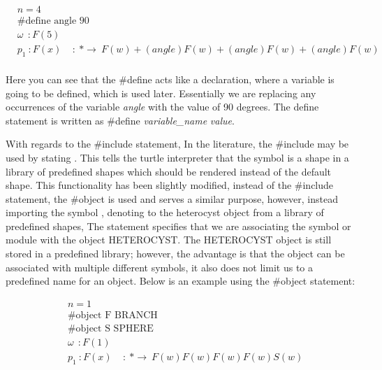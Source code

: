 \begin{singlespace}
\begin{equation} \label{define statement example}
\begin{aligned}
	&n=4 \\
	&\textrm{\#define angle 90}\\
	&\omega~~ : F(5)\\
	&p_1~ :  F(x)~~~~~ :~ * \rightarrow~ F(w)+(angle)F(w)+(angle)F(w)+(angle)F(w)\\
\end{aligned}
\end{equation}
\end{singlespace}
\vspace{5mm}
\noindent
Here you can see that the \#define acts like a declaration, where a variable is going to be defined, which is used later. Essentially we are replacing any occurrences of the variable \textit{angle} with the value of 90 degrees. The define statement is written as  \#define \textit{variable\_name} \textit{value}.

With regards to the \#include statement, In the literature, the \#include may be used by stating . This tells the turtle interpreter that the symbol  is a shape in a library of predefined shapes which should be rendered instead of the default shape. This functionality has been slightly modified, instead of the \#include statement, the \#object is used and serves a similar purpose, however, instead importing the symbol , denoting to the heterocyst object from a library of predefined shapes, The statement  specifies that we are associating the symbol or module  with the object HETEROCYST. The HETEROCYST object is still stored in a predefined library; however, the advantage is that the object can be associated with multiple different symbols, it also does not limit us to a predefined name for an object. Below is an example using the \#object statement: 

\begin{singlespace}
\begin{equation} \label{object statement example}
\begin{aligned}
	&n=1 \\
	&\textrm{\#object F BRANCH}\\
	&\textrm{\#object S SPHERE}\\
	&\omega~~ : F(1)\\
	&p_1~ :  F(x)~~~~~ :~ * \rightarrow~ F(w)F(w)F(w)F(w)S(w)\\
\end{aligned}
\end{equation}
\end{singlespace}

